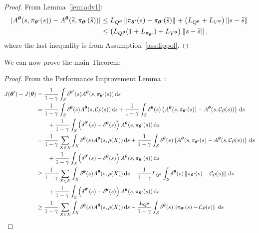 \begin{proof}
	From Lemma~\ref{lem:adv1}:
	\begin{align}
	|A^{\boldsymbol{\theta}}(s,\pi_{\boldsymbol{\theta}'}(s)) - A^{\boldsymbol{\theta}}(\widetilde{s},\pi_{\boldsymbol{\theta}'}(\widetilde{s}))| 
	&\leq L_{Q^{\boldsymbol{\theta}}}\left\|\pi_{\boldsymbol{\theta}'}(s) - \pi_{\boldsymbol{\theta}'}(\widetilde{s})\right\|_{} + \left(L_{Q^{\boldsymbol{\theta}}} + L_{V^{\boldsymbol{\theta}}}\right)\left\|s-\widetilde{s}\right\|_{} \nonumber\\
	&\leq \left(L_{Q^{\boldsymbol{\theta}}}(1 + L_{\pi_{\boldsymbol{\theta}'}}) + L_{V^{\boldsymbol{\theta}}}\right)\left\|s-\widetilde{s}\right\|_{},
	\end{align}
	where the last inequality is from Assumption~\ref{ass:lippol}.
\end{proof}
We can now prove the main Theorem:
\boundj*
\begin{proof}
	From the Performance Improvement Lemma~\citep{kakade2002approximately}:
	\begin{align}
	J(\vtheta') - J(\vtheta) 
	&=\frac{1}{1-\gamma} \int_{\Sspace}\delta^{\vtheta'}(s)A^{\vtheta}(s,\pi_{\vtheta'}(s))\de s \nonumber \\
	&= \frac{1}{1-\gamma}\int_{\Sspace}\delta^{\vtheta}(s)A^{\vtheta}(s,\Conc\rho(s))\de s 
	+ \frac{1}{1-\gamma}\int_{\Sspace}\delta^{\vtheta}(s)\left(A^{\vtheta}(s,\pi_{\vtheta'}(s)) - A^{\vtheta}(s,\Conc\rho(s))\right)\de s
	\nonumber\\&\qquad+
	\frac{1}{1-\gamma}\int_{\Sspace}\left(\delta^{\vtheta'}(s) - \delta^{\vtheta}(s)\right)A^{\vtheta}(s,\pi_{\vtheta'}(s))\de s \nonumber\\		
	&= \frac{1}{1-\gamma}\sum_{X\in\Xspace}\int_{X}\delta^{\vtheta}(s)A^{\vtheta}(s,\rho(X))\de s 
	+ \frac{1}{1-\gamma}\int_{\Sspace}\delta^{\vtheta}(s)\left(A^{\vtheta}(s,\pi_{\vtheta'}(s) - A^{\vtheta}(s,\Conc\rho(s))\right)\de s 
	\nonumber\\&\qquad+ \frac{1}{1-\gamma}\int_{\Sspace}\left(\delta^{\vtheta'}(s) - \delta^{\vtheta}(s)\right)A^{\vtheta}(s,\pi_{\vtheta'}(s))\de s \label{p:2}\\
	&\geq  \frac{1}{1-\gamma}\sum_{X\in\Xspace}\int_{X}\delta^{\vtheta}(s)A^{\vtheta}(s,\rho(X))\de s 
	- \frac{1}{1-\gamma}L_{Q^{\vtheta}}\int_{\Sspace}\delta^{\vtheta}(s)\norm{\pi_{\vtheta'}(s) - \Conc\rho(s)} \de s
	\nonumber\\&\qquad+ \frac{1}{1-\gamma}\int_{\Sspace}\left(\delta^{\vtheta'}(s) - \delta^{\vtheta}(s)\right)A^{\vtheta}(s,\pi_{\vtheta'}(s))\de s \label{p:3}\\
	&\geq  \frac{1}{1-\gamma}\sum_{X\in\Xspace}\int_{X}\delta^{\vtheta}(s)A^{\vtheta}(s,\rho(X))\de s 
	- \frac{L_{Q^{\vtheta}}}{1-\gamma}\int_{\Sspace}\delta^{\vtheta}(s)\norm{\pi_{\vtheta'}(s) - \Conc\rho(s)} \de s

\end{align}
\end{proof}
